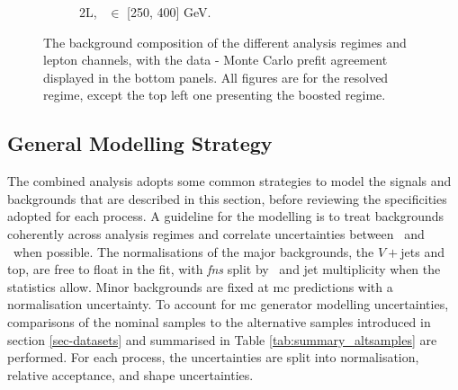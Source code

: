 \begin{figure}[h!]
{\begin{subfigure}[b]{0.37\textwidth}
            \caption{2L, \ptv\ $\in$ [250, 400] GeV.}
            \label{fig:backCom_2L_3}
        \end{subfigure} 
    }
    \caption{The background composition of the different analysis regimes and lepton channels, with the data - Monte Carlo prefit agreement displayed in the bottom panels. All figures are for the resolved regime, except the top left one presenting the boosted regime.}
    \label{fig:backCom}
\end{figure} 

\subsection{General Modelling Strategy}\label{sec-modStrat}
The combined analysis adopts some common strategies to model the signals and backgrounds that are described in this section, before reviewing the specificities adopted for each process. A guideline for the modelling is to treat backgrounds coherently across analysis regimes and correlate uncertainties between \vhb\ and \vhc\ when possible. The normalisations of the major backgrounds, the $V+$jets and top, are free to float in the fit, with \textit{\glspl{fn}} split by \ptv\ and jet multiplicity when the statistics allow. Minor backgrounds are fixed at \gls{mc} predictions with a normalisation uncertainty. To account for \gls{mc} generator modelling uncertainties, comparisons of the nominal samples to the alternative samples introduced in section \ref{sec-datasets} and summarised in Table \ref{tab:summary_altsamples} are performed. For each process, the uncertainties are split into normalisation, relative acceptance, and shape uncertainties.  %

